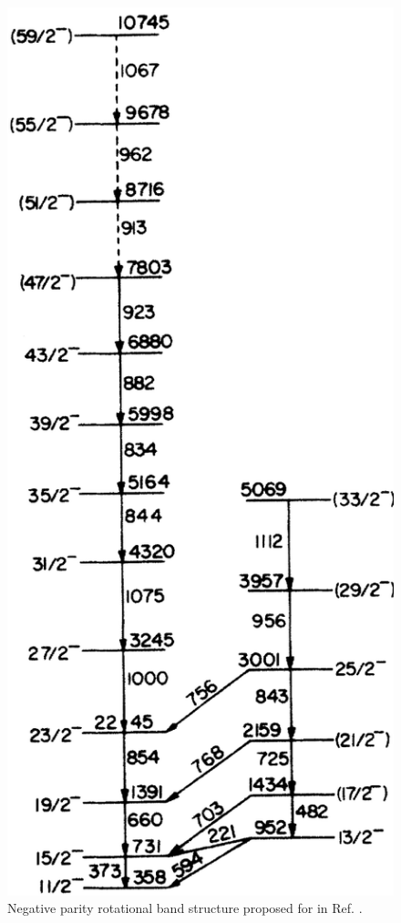 \begin{figure}[b!]
\centerline{\includegraphics[height=0.4\textheight]{./img/c4/old_scheme_bands.png}}
	\caption{Negative parity rotational band structure proposed for \pr{} in Ref. \cite{semkow135Pr}.\label{fig:chp4-semkow-prev-bands}}
\end{figure}
